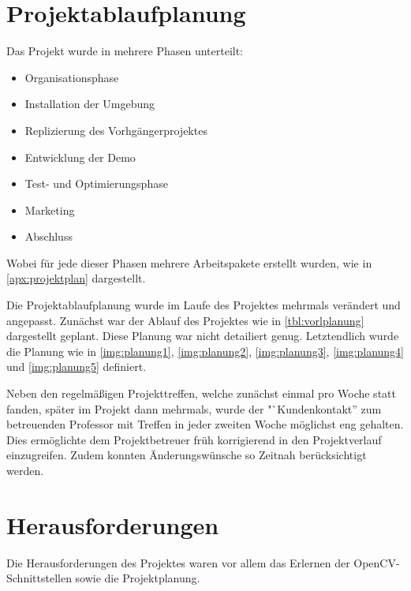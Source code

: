     \section{Projektablaufplanung}

        Das Projekt wurde in mehrere Phasen unterteilt:

        \begin{itemize}
            \item Organisationsphase
            \item Installation der Umgebung
            \item Replizierung des Vorhgängerprojektes
            \item Entwicklung der Demo
            \item Test- und Optimierungsphase
            \item Marketing
            \item Abschluss
        \end{itemize}

        Wobei für jede dieser Phasen mehrere Arbeitspakete erstellt wurden, wie
        in \ref{apx:projektplan} dargestellt.

        Die Projektablaufplanung wurde im Laufe des Projektes mehrmals verändert
        und angepasst.
        Zunächst war der Ablauf des Projektes wie in \autoref{tbl:vorlplanung}
        dargestellt geplant.
        Diese Planung war nicht detailiert genug.
        Letztendlich wurde die Planung wie in
        \autoref{img:planung1},
        \autoref{img:planung2},
        \autoref{img:planung3},
        \autoref{img:planung4} und
        \autoref{img:planung5}
        definiert.

        Neben den regelmäßigen Projekttreffen, welche zunächst einmal pro Woche
        statt fanden, später im Projekt dann mehrmals, wurde der
        "`Kundenkontakt'' zum betreuenden Professor mit Treffen in jeder zweiten
        Woche möglichst eng gehalten.
        Dies ermöglichte dem Projektbetreuer früh korrigierend in den
        Projektverlauf einzugreifen.
        Zudem konnten Änderungswünsche so Zeitnah berücksichtigt werden.

    \section{Herausforderungen}

        Die Herausforderungen des Projektes waren vor allem das Erlernen der
        OpenCV-Schnittstellen sowie die Projektplanung.

